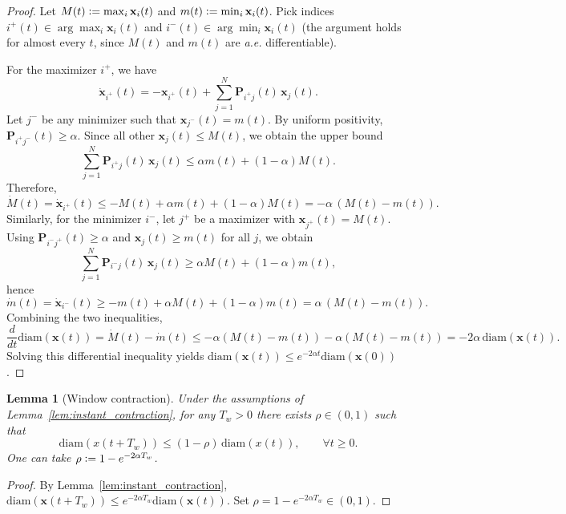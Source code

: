 \documentclass{article}
\newcommand{\defeq}{\vcentcolon=}
\theoremstyle{plain}
\newtheorem{lemma}[theorem]{Lemma}
\theoremstyle{definition}
\theoremstyle{remark}
\begin{document}
\begin{proof}
    Let $M(t)\defeq \max_i \textbf{x}_i(t)$ and $m(t)\defeq \min_i \textbf{x}_i(t)$.
    Pick indices $i^+(t)\in\arg\max_i \textbf{x}_i(t)$ and $i^-(t)\in\arg\min_i \textbf{x}_i(t)$
    (the argument holds for almost every $t$, since $M(t)$ and $m(t)$ are \textit{a.e.} differentiable).

    For the maximizer $i^+$, we have
    \[
        \dot{\textbf{x}}_{i^+}(t) = -\textbf{x}_{i^+}(t) + \sum_{j=1}^N \textbf{P}_{i^+ j}(t)\,\textbf{x}_j(t).
    \]
    Let $j^-$ be any minimizer such that $\textbf{x}_{j^-}(t)=m(t)$. By uniform
    positivity, $\textbf{P}_{i^+ j^-}(t)\ge \alpha$. Since all other
    $\textbf{x}_j(t)\le M(t)$, we obtain the upper bound
    \[
        \sum_{j=1}^N \textbf{P}_{i^+ j}(t)\,\textbf{x}_j(t)
        \le \alpha m(t) + (1-\alpha)M(t).
    \]
    Therefore,
    \[
        \dot M(t) = \dot{\textbf{x}}_{i^+}(t)
        \le -M(t) + \alpha m(t) + (1-\alpha)M(t)
        = -\alpha\,(M(t)-m(t)).
    \]
    Similarly, for the minimizer $i^-$, let $j^+$ be a maximizer with
    $\textbf{x}_{j^+}(t)=M(t)$. Using $\textbf{P}_{i^- j^+}(t)\ge \alpha$ and
    $\textbf{x}_j(t)\ge m(t)$ for all $j$, we obtain
    \[
        \sum_{j=1}^N \textbf{P}_{i^- j}(t)\,\textbf{x}_j(t)
        \ge \alpha M(t) + (1-\alpha)m(t),
    \]
    hence
    \[
        \dot m(t) = \dot{\textbf{x}}_{i^-}(t)
        \ge -m(t) + \alpha M(t) + (1-\alpha)m(t)
        = \alpha\,(M(t)-m(t)).
    \]
    Combining the two inequalities,
    \[
        \frac{d}{dt}\mathrm{diam}(\textbf{x}(t))
        = \dot M(t) - \dot m(t)
        \le -\alpha(M(t)-m(t)) - \alpha(M(t)-m(t))
        = -2\alpha\,\mathrm{diam}(\textbf{x}(t)).
    \]
    Solving this differential inequality yields $\mathrm{diam}(\textbf{x}(t)) \le
        e^{-2\alpha t}\mathrm{diam}(\textbf{x}(0))$.
\end{proof}

\begin{lemma}[Window contraction]
    \label{lem:window_contraction_app}
    Under the assumptions of Lemma~\ref{lem:instant_contraction},
    for any $T_w>0$ there exists $\rho\in(0,1)$ such that
    \[
        \mathrm{diam}(x(t+T_w)) \le (1-\rho)\,\mathrm{diam}(x(t)),\qquad \forall t\ge 0.
    \]
    One can take $\rho \defeq 1-e^{-2\alpha T_w}$.
\end{lemma}

\begin{proof}
    By Lemma~\ref{lem:instant_contraction},
    $\mathrm{diam}(\textbf{x}(t+T_w)) \le e^{-2\alpha T_w}\mathrm{diam}(\textbf{x}(t))$.
    Set $\rho = 1-e^{-2\alpha T_w}\in(0,1)$.
\end{proof}
\end{document}
